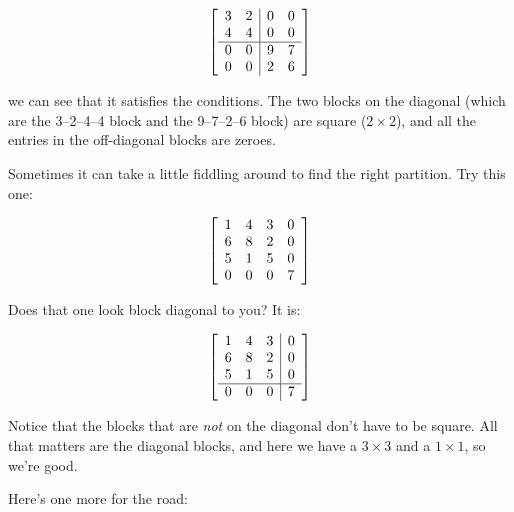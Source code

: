 \vspace{-.15in}
\begin{align*}
\mleft[
\begin{array}{cc|cc}
3 & 2 & 0 & 0\\
4 & 4 & 0 & 0\\
\hline
0 & 0 & 9 & 7 \\
0 & 0 & 2 & 6 \\
\end{array}
\mright]
\end{align*}
\vspace{-.15in}

we can see that it satisfies the conditions. The two blocks on the diagonal
(which are the 3--2--4--4 block and the 9--7--2--6 block) are square ($2\times
2$), and all the entries in the off-diagonal blocks are zeroes.

Sometimes it can take a little fiddling around to find the right partition. Try
this one:

\vspace{-.15in}
\begin{align*}
\mleft[
\begin{array}{cccc}
1 & 4 & 3 & 0\\
6 & 8 & 2 & 0\\
5 & 1 & 5 & 0 \\
0 & 0 & 0 & 7 \\
\end{array}
\mright]
\end{align*}
\vspace{-.15in}

Does that one look block diagonal to you? It is:

\vspace{-.15in}
\begin{align*}
\mleft[
\begin{array}{ccc|c}
1 & 4 & 3 & 0\\
6 & 8 & 2 & 0\\
5 & 1 & 5 & 0 \\
\hline
0 & 0 & 0 & 7 \\
\end{array}
\mright]
\end{align*}
\vspace{-.15in}

Notice that the blocks that are \textit{not} on the diagonal don't have to be
square. All that matters are the diagonal blocks, and here we have a $3\times
3$ and a $1\times 1$, so we're good.

Here's one more for the road:

